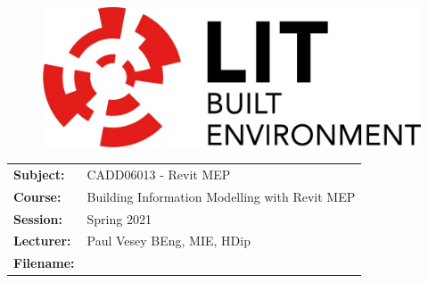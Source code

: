 \documentclass[a4paper, 10pt]{article}
\begin{document}
\lstset{language=HTML,
				basicstyle=\small,
				breaklines=true,
        numbers=left,
        numberstyle=\tiny,
        showstringspaces=false,
        aboveskip=-20pt,
        frame=leftline
        }
				
\begin{figure}
	\centering
	\includegraphics[width=0.5\linewidth]{./Assignments/img/LITlogo}
\end{figure}


\begin{tabularx}{\textwidth}{ |l|X| }
	\hline
	\textbf{Subject:} & CADD06013 - Revit MEP\\
	\textbf{Course:} & Building Information Modelling with Revit MEP\\
	\textbf{Session:} & Spring 2021\\
	\textbf{Lecturer:} & Paul Vesey \footnotesize{BEng, MIE, HDip}\\
	\textbf{Filename:} & \currfilebase\\
	\hline
\end{tabularx}



\vspace{0.25cm}	
\end{document}
